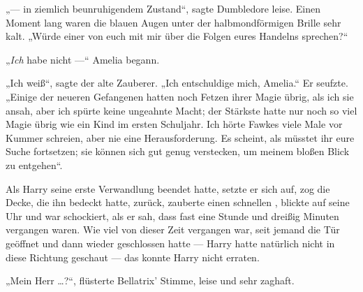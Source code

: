 „— in ziemlich beunruhigendem Zustand“, sagte Dumbledore leise. Einen Moment lang waren die blauen Augen unter der halbmondförmigen Brille sehr kalt.
„Würde einer von euch mit mir über die Folgen eures Handelns sprechen?“

„\emph{Ich} habe nicht —“ Amelia begann.

„Ich weiß“, sagte der alte Zauberer.
„Ich entschuldige mich, Amelia.“ Er seufzte.
„Einige der neueren Gefangenen hatten noch Fetzen ihrer Magie übrig, als ich sie ansah, aber ich spürte keine ungeahnte Macht; der Stärkste hatte nur noch so viel Magie übrig wie ein Kind im ersten Schuljahr. Ich hörte Fawkes viele Male vor Kummer schreien, aber nie eine Herausforderung. Es scheint, als müsstet ihr eure Suche fortsetzen; sie können sich gut genug verstecken, um meinem bloßen Blick zu entgehen“.

\later

Als Harry seine erste Verwandlung beendet hatte, setzte er sich auf, zog die Decke, die ihn bedeckt hatte, zurück, zauberte einen schnellen , blickte auf seine Uhr und war schockiert, als er sah, dass fast eine Stunde und dreißig Minuten vergangen waren. Wie viel von dieser Zeit vergangen war, seit jemand die Tür geöffnet und dann wieder geschlossen hatte — Harry hatte natürlich nicht in diese Richtung geschaut — das konnte Harry nicht erraten.

„Mein Herr …?“, flüsterte Bellatrix’ Stimme, leise und sehr zaghaft.

